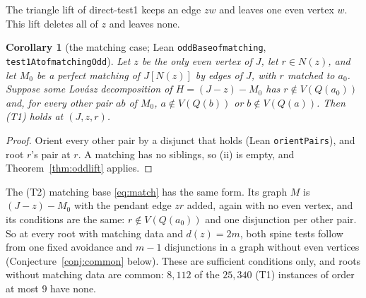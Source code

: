 \documentclass[11pt]{amsart}
\newtheorem{corollary}[theorem]{Corollary}
\theoremstyle{definition}
\theoremstyle{remark}
\renewcommand{\_}{\oldunderscore\allowbreak}
\begin{document}
The triangle lift of direct-test1 keeps an edge $zw$ and leaves one even vertex $w$.
This lift deletes all of $z$ and leaves none.

\begin{corollary}[the matching case; Lean \texttt{oddBase\_of\_matching}, \texttt{test1At\_of\_matchingOdd}]\label{cor:oddmatch}
Let $z$ be the only even vertex of $J$, let $r\in N(z)$, and let $M_0$ be a perfect matching of
$J[N(z)]$ by edges of $J$, with $r$ matched to $a_0$. Suppose some Lov\'asz decomposition of
$H=(J-z)-M_0$ has $r\notin V(Q(a_0))$ and, for every other pair $ab$ of $M_0$, $a\notin V(Q(b))$ or
$b\notin V(Q(a))$. Then (T1) holds at $(J,z,r)$.
\end{corollary}

\begin{proof}
Orient every other pair by a disjunct that holds (Lean \texttt{orientPairs}), and root $r$'s pair
at $r$. A matching has no siblings, so (ii) is empty, and Theorem~\ref{thm:oddlift} applies.
\end{proof}

The (T2) matching base \eqref{eq:match} has the same form. Its graph $M$ is $(J-z)-M_0$ with the
pendant edge $zr$ added, again with no even vertex, and its conditions are the same: $r\notin
V(Q(a_0))$ and one disjunction per other pair. So at every root with matching data and
$d(z)=2m$, both spine tests follow from one fixed avoidance and $m-1$ disjunctions in a graph
without even vertices (Conjecture~\ref{conj:common} below). These are sufficient conditions only,
and roots without matching data are common: $8{,}112$ of the $25{,}340$ (T1) instances of order at
most $9$ have none.
\end{document}
